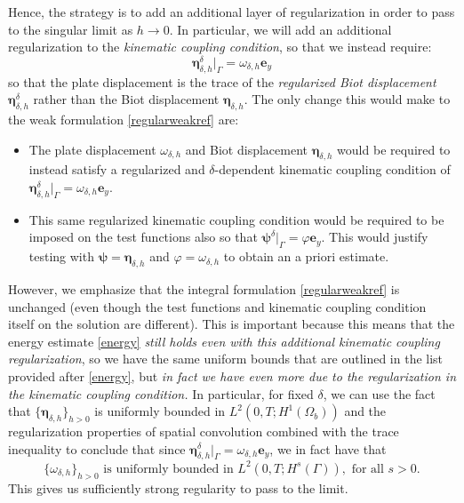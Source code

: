 \documentclass[11pt]{article}
\newcommand{\bd}{\boldsymbol}
\theoremstyle{definition}
\begin{document}
Hence, the strategy is to add an additional layer of regularization in order to pass to the singular limit as $h \to 0$. In particular, we will add an additional regularization to the \textit{kinematic coupling condition}, so that we instead require:
\begin{equation*}
\bd{\eta}^{\delta}_{\delta, h}|_{\Gamma} = \omega_{\delta, h} \bd{e}_{y} 
\end{equation*}
so that the plate displacement is the trace of the \textit{regularized Biot displacement} $\bd{\eta}^{\delta}_{\delta, h}$ rather than the Biot displacement $\bd{\eta}_{\delta, h}$. The only change this would make to the weak formulation \eqref{regularweakref} are:
\begin{itemize}
\item The plate displacement $\omega_{\delta, h}$ and Biot displacement $\bd{\eta}_{\delta, h}$ would be required to instead satisfy a regularized and $\delta$-dependent kinematic coupling condition of $\bd{\eta}_{\delta, h}^{\delta}|_{\Gamma} = \omega_{\delta, h} \bd{e}_{y}$.
\item This same regularized kinematic coupling condition would be required to be imposed on the test functions also so that $\bd{\psi}^{\delta}|_{\Gamma} = \varphi \bd{e}_{y}$. This would justify testing with $\bd{\psi} = \bd{\eta}_{\delta, h}$ and $\varphi = \omega_{\delta, h}$ to obtain an a priori estimate.
\end{itemize}
However, we emphasize that the integral formulation \eqref{regularweakref} is unchanged (even though the test functions and kinematic coupling condition itself on the solution are different). This is important because this means that the energy estimate \eqref{energy} \textit{still holds even with this additional kinematic coupling regularization}, so we have the same uniform bounds that are outlined in the list provided after \eqref{energy}, but \textit{in fact we have even more due to the regularization in the kinematic coupling condition.} In particular, for fixed $\delta$, we can use the fact that $\{\bd{\eta}_{\delta, h}\}_{h > 0}$ is uniformly bounded in $L^{2}(0, T; H^{1}(\Omega_{b}))$ and the regularization properties of spatial convolution combined with the trace inequality to conclude that since $\bd{\eta}^{\delta}_{\delta, h}|_{\Gamma} = \omega_{\delta, h} \bd{e}_{y}$, we in fact have that
\begin{equation*}
\{\omega_{\delta, h}\}_{h > 0} \text{ is uniformly bounded in $L^{2}(0, T; H^{s}(\Gamma))$}, \text{ for all $s > 0$}.
\end{equation*}
This gives us sufficiently strong regularity to pass to the limit. 
\end{document}
